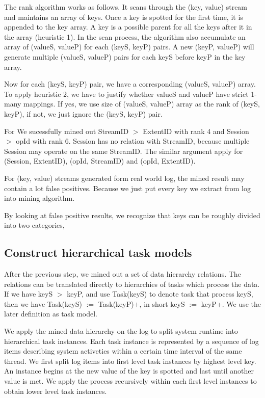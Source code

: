 The rank algorithm works as follows. It scans through the
(key, value) stream and maintains an array of keys. Once a
key is spotted for the first time, it is appended to the key
array. A key is a possible parent for all the keys after it
in the array (heuristic 1). In the scan process, the algorithm also
accumulate an array of (valueS, valueP) for each (keyS, keyP)
pairs. A new (keyP, valueP) will generate multiple (valueS,
valueP) pairs for each keyS before keyP in the key array.

Now for each (keyS, keyP) pair, we have a corresponding
(valueS, valueP) array. To apply heuristic 2, we have to
justify whether valueS and valueP have strict 1-many
mappings. If yes, we use size of (valueS, valueP) array
as the rank of (keyS, keyP), if not, we just ignore the
(keyS, keyP) pair.


For We sucessfully mined out StreamID $>$ ExtentID with rank 4
and Session $>$ opId with rank 6. Session has no relation
with StreamID, because multiple Session may operate on the
same StreamID. The similar argument apply for (Session,
ExtentID), (opId, StreamID) and (opId, ExtentID).

For (key, value) streams generated form real world log, the
mined result may contain a lot false positives. Because we
just put every key we extract from log into mining
algorithm.

By looking at false positive results, we recognize that keys
can be roughly divided into two categories, 

\subsection{Construct hierarchical task models}

After the previous step, we mined out a set of data
hierarchy relations. The relations can be translated
directly to hierarchies of tasks which process the data. 
If we have keyS $>$ keyP, and use Task(keyS) to denote task
that process keyS, then we have Task(keyS) $:=$
Task(keyP)$+$, in short keyS $:=$ keyP+. We use the later
definition as task model.

We apply the mined data hierarchy on the log to split system
runtime into hierarchical task instances. Each task instance
is represented by a sequence of log items describing system
activeties within a certain time interval of the same
thread. We first split log items into first level task
instances by highest level key. An instance begins at the
new value of the key is spotted and last until another value
is met. We apply the process recursively within each first
level instances to obtain lower level task instances.

